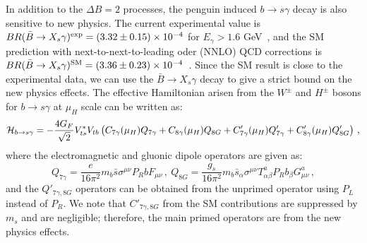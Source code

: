\documentclass[prd,preprint,superscriptaddress,amsmath,amssymb]{revtex4}
\begin{document}
In addition to the $\Delta B=2$ processes,  the penguin induced $b\to s \gamma$ decay is also sensitive to new physics. The current experimental value is $BR(\bar B \to X_s \gamma)^{\rm exp}=(3.32 \pm  0.15) \times 10^{-4}$ for $E_\gamma > 1.6$ GeV~\cite{Amhis:2016xyh}, and the  SM prediction with next-to-next-to-leading oder (NNLO) QCD corrections  is  $BR(\bar B \to X_s \gamma)^{\rm SM}=(3.36 \pm  0.23) \times 10^{-4}$~\cite{Czakon:2015exa,Misiak:2015xwa}.  Since the SM result is close to  the experimental data, we can use the $\bar B \to X_s \gamma$ decay to  give a strict bound on the new physics effects. The effective Hamiltonian arisen from the $W^\pm$ and $H^\pm$ bosons for $b\to s \gamma$ at $\mu_H$ scale can be written as:
\begin{align}
{\cal H}_{b\to s \gamma} = -\frac{4G_F}{\sqrt{2}} V^*_{ts} V_{tb} \left(C_{7\gamma} (\mu_H)Q_{7\gamma}  + C_{8\gamma} (\mu_H)Q_{8G} + C'_{7\gamma} (\mu_H)Q'_{7\gamma}  + C'_{8\gamma} (\mu_H)Q'_{8G}\right)\,, \label{eq:Hbtosga}
\end{align}
where the electromagnetic and gluonic dipole operators are given as:
 \begin{equation}
 Q_{7\gamma} = \frac{e}{16\pi^2} m_b \bar s \sigma^{\mu\nu} P_R b F_{\mu\nu}\,, \ Q_{8G} = \frac{g_s}{16\pi^2} m_b \bar s_\alpha \sigma^{\mu\nu}  T^a_{\alpha \beta} P_R b_\beta G^a_{\mu\nu}\,,
 \end{equation}
 and the $Q'_{7\gamma, 8G}$ operators can be obtained from the unprimed operator using $P_L$ instead of $P_R$.  We note that  $C'_{7\gamma,8G}$ from the SM contributions are suppressed by $m_s$ and are negligible; therefore, the main primed operators are from the new physics effects.  
 
  
\end{document}
